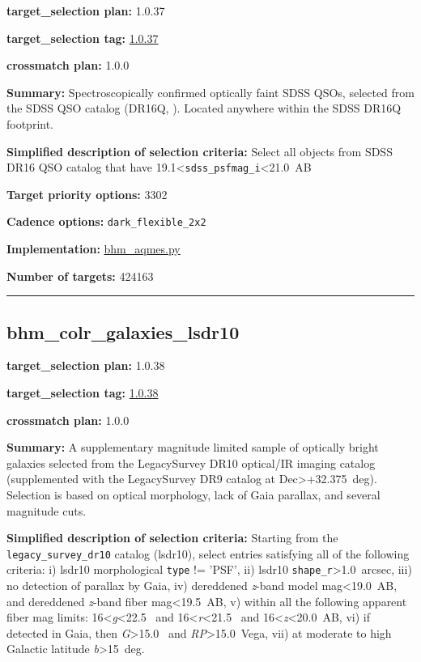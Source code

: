 \noindent\textbf{target\_selection plan:} 1.0.37

\noindent\textbf{target\_selection tag:}
\href{https://github.com/sdss/target_selection/tree/1.0.37/}{1.0.37}

\noindent\textbf{crossmatch plan:} 1.0.0

\noindent\textbf{Summary:} Spectroscopically confirmed optically faint SDSS QSOs,
selected from the SDSS QSO catalog (DR16Q,
\citealt{Lyke2020}). Located anywhere within the SDSS DR16Q footprint.

\noindent\textbf{Simplified description of selection criteria:} Select all
objects from SDSS DR16 QSO catalog that have
19.1\textless{}\texttt{sdss\_psfmag\_i}\textless21.0~AB


\noindent\textbf{Target priority options:} 3302

\noindent\textbf{Cadence options:} \texttt{dark\_flexible\_2x2}

\noindent\textbf{Implementation:}
\href{https://github.com/sdss/target_selection/blob/1.0.37/python/target_selection/cartons/bhm_aqmes.py}{bhm\_aqmes.py}

\noindent\textbf{Number of targets:} 424163

\begin{center}\rule{0.5\linewidth}{0.5pt}\end{center}

\hypertarget{bhm_colr_galaxies_lsdr10_plan1.0.38}{%
\subsection{bhm\_colr\_galaxies\_lsdr10}\label{bhm_colr_galaxies_lsdr10_plan1.0.38}}

\noindent\textbf{target\_selection plan:} 1.0.38

\noindent\textbf{target\_selection tag:}
\href{https://github.com/sdss/target_selection/tree/1.0.38/}{1.0.38}

\noindent\textbf{crossmatch plan:} 1.0.0

\noindent\textbf{Summary:} A supplementary magnitude limited sample of optically
bright galaxies selected from the LegacySurvey DR10 optical/IR imaging
catalog (supplemented with the LegacySurvey DR9 catalog at
Dec\textgreater+32.375~deg). Selection is based on optical morphology,
lack of Gaia parallax, and several magnitude cuts.

\noindent\textbf{Simplified description of selection criteria:} Starting from the
\texttt{legacy\_survey\_dr10} catalog (lsdr10), select entries
satisfying all of the following criteria: i) lsdr10 morphological
\texttt{type} != 'PSF', ii) lsdr10
\texttt{shape\_r}\textgreater1.0~arcsec, iii) no detection of parallax
by Gaia, iv) dereddened \emph{z}-band model mag\textless19.0~AB, and
dereddened \emph{z}-band fiber mag\textless19.5~AB, v) within all the
following apparent fiber mag limits: 16\textless{}\emph{g}\textless22.5~
and 16\textless{}\emph{r}\textless21.5~ and
16\textless{}\emph{z}\textless20.0~AB, vi) if detected in Gaia, then
\emph{G}\textgreater15.0~ and \emph{RP}\textgreater15.0~Vega, vii) at
moderate to high Galactic latitude
\textbar{}\emph{b}\textbar\textgreater15~deg.


